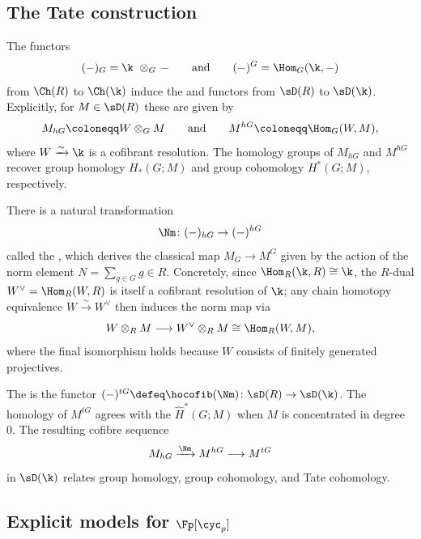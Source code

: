 \subsection{The Tate construction}

The functors
\[
(-)_G = \k \ \otimes_G \, -
\qquad \text{and} \qquad
(-)^G = \Hom_G(\k, -)
\]
from \(\Ch(R)\) to \(\Ch(\k)\) induce the  and  functors from \(\sD(R)\) to \(\sD(\k)\).
Explicitly, for \(M \in \sD(R)\) these are given by
\[
M_{hG} \coloneqq W \otimes_G M
\qquad \text{and} \qquad
M^{hG} \coloneqq \Hom_G(W, M),
\]
where \(W \xrightarrow{\sim} \k\) is a cofibrant resolution.
The homology groups of \(M_{hG}\) and \(M^{hG}\) recover group homology \(H_*(G; M)\) and group cohomology \(H^*(G; M)\), respectively.

There is a natural transformation
\[
\Nm \colon (-)_{hG} \to (-)^{hG}
\]
called the , which derives the classical map \(M_G \to M^G\) given by the action of the norm element \(N = \sum_{g \in G} g \in R\).
Concretely, since \(\Hom_R(\k, R) \cong \k\), the \(R\)-dual \(W^\vee = \Hom_R(W, R)\) is itself a cofibrant resolution of \(\k\); any chain homotopy equivalence \(W \xrightarrow{\sim} W^\vee\) then induces the norm map via
\[
W \otimes_R M \longrightarrow W^\vee \otimes_R M \cong \Hom_R(W, M),
\]
where the final isomorphism holds because \(W\) consists of finitely generated projectives.

The  is the functor \((-)^{tG} \defeq \hocofib(\Nm) \colon \sD(R) \to \sD(\k)\).
The homology of \(M^{tG}\) agrees with the  \(\widehat{H}^*(G; M)\) when \(M\) is concentrated in degree 0.
The resulting cofibre sequence
\[
M_{hG} \xrightarrow{\Nm} M^{hG} \longrightarrow M^{tG}
\]
in \(\sD(\k)\) relates group homology, group cohomology, and Tate cohomology. %

\subsection{Explicit models for \(\Fp[\cyc_p]\)}

